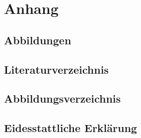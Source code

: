 \documentclass[a4paper,12pt,oneside]{article}
\begin{document}
  \section{Anhang}
    \subsection{Abbildungen}
    \subsection{Literaturverzeichnis}
      \printbibliography
    \subsection{Abbildungsverzeichnis}
    \subsection{Eidesstattliche Erklärung}
\end{document}
